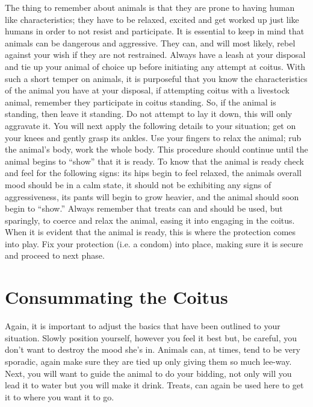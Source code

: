 The thing to remember about animals is that they are prone to having human like 
characteristics; they have to be relaxed, excited and get worked up just like 
humans in order to not resist and participate. It is essential to keep in mind 
that animals can be dangerous and aggressive. They can, and will most likely, 
rebel against your wish if they are not restrained. Always have a leash at your 
disposal and tie up your animal of choice up before initiating any attempt at 
coitus. With such a short temper on animals, it is purposeful that you know the 
characteristics of the animal you have at your disposal, if attempting coitus 
with a livestock animal, remember they participate in coitus standing. So, if 
the animal is standing, then leave it standing. Do not attempt to lay it down, 
this will only aggravate it. You will next apply the following details to your 
situation; get on your knees and gently grasp its ankles. Use your fingers to 
relax the animal; rub the animal’s body, work the whole body. This procedure 
should continue until the animal begins to “show” that it is ready. To know that 
the animal is ready check and feel for the following signs: its hips begin to 
feel relaxed, the animals overall mood should be in a calm state, it should not 
be exhibiting any signs of aggressiveness, its pants will begin to grow heavier, 
and the animal should soon begin to “show.” Always remember that treats can and 
should be used, but sparingly, to coerce and relax the animal, easing it into 
engaging in the coitus. When it is evident that the animal is ready, this is 
where the protection comes into play. Fix your protection (i.e. a condom) into 
place, making sure it is secure and proceed to next phase.

          

       

    \section*{Consummating the Coitus}

              Again, it is important to adjust the basics that have been 
outlined to your situation. Slowly position yourself, however you feel it best 
but, be careful, you don’t want to destroy the mood she's in. Animals can, at 
times, tend to be very sporadic, again make sure they are tied up only giving 
them so much lee-way. Next, you will want to guide the animal to do your 
bidding, not only will you lead it to water but you will make it drink. Treats, 
can again be used here to get it to where you want it to go.

